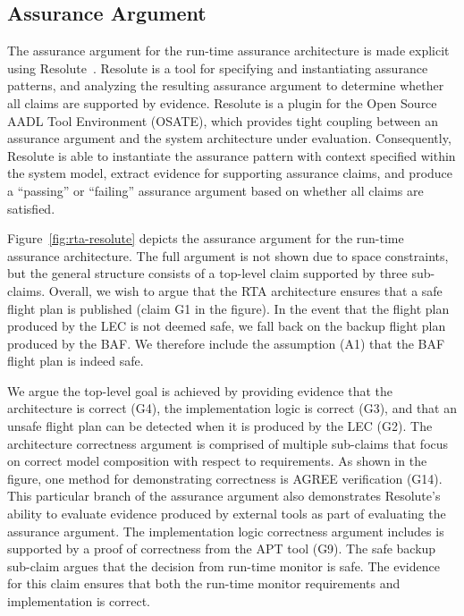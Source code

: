 \subsection{Assurance Argument}

The assurance argument for the run-time assurance architecture is made explicit using Resolute~\cite{resolute}.  Resolute is a tool for specifying and instantiating assurance patterns, and analyzing the resulting assurance argument to determine whether all claims are supported by evidence.  Resolute is a plugin for the Open Source AADL Tool Environment (OSATE), which provides tight coupling between an assurance argument and the system architecture under evaluation.  Consequently, Resolute is able to instantiate the assurance pattern with context specified within the system model, extract evidence for supporting assurance claims, and produce a ``passing'' or ``failing'' assurance argument based on whether all claims are satisfied.

Figure~\ref{fig:rta-resolute} depicts the assurance argument for the run-time assurance architecture.  The full argument is not shown due to space constraints, but the general structure consists of a top-level claim supported by three sub-claims.  Overall, we wish to argue that the RTA architecture ensures that a safe flight plan is published (claim G1 in the figure).  In the event that the flight plan produced by the LEC is not deemed safe, we fall back on the backup flight plan produced by the BAF.  We therefore include the assumption (A1) that the BAF flight plan is indeed safe.

We argue the top-level goal is achieved by providing evidence that the architecture is correct (G4), the implementation logic is correct (G3), and that an unsafe flight plan can be detected when it is produced by the LEC (G2).  The architecture correctness argument is comprised of multiple sub-claims that focus on correct model composition with respect to requirements.  As shown in the figure, one method for demonstrating correctness is AGREE verification (G14).  This particular branch of the assurance argument also demonstrates Resolute's ability to evaluate evidence produced by external tools as part of evaluating the assurance argument.
%
The implementation logic correctness argument includes is supported by a proof of correctness from the APT tool (G9). The safe backup sub-claim argues that the decision from run-time monitor is safe. The evidence for this claim ensures that both the run-time monitor requirements and implementation is correct. 

